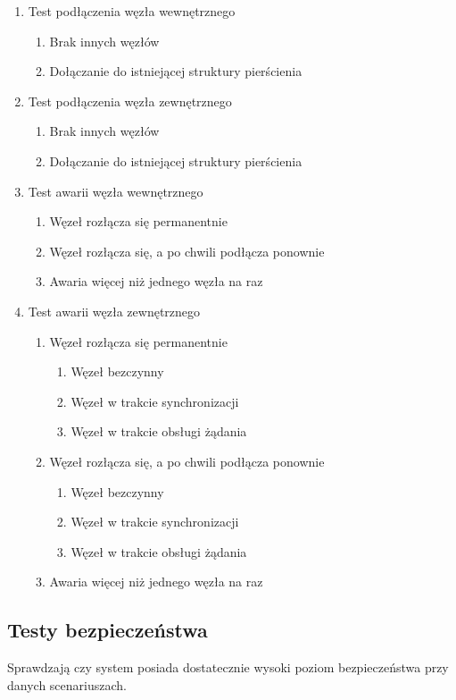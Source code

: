 \begin{enumerate}
\item Test podłączenia węzła wewnętrznego
	\begin{enumerate}
	\item Brak innych węzłów
	\item Dołączanie do istniejącej struktury pierścienia
	\end{enumerate}
\item Test podłączenia węzła zewnętrznego
	\begin{enumerate}
	\item Brak innych węzłów
	\item Dołączanie do istniejącej struktury pierścienia
	\end{enumerate}
\item Test awarii węzła wewnętrznego
	\begin{enumerate}
	\item Węzeł rozłącza się permanentnie
	\item Węzeł rozłącza się, a po chwili podłącza ponownie
	\item Awaria więcej niż jednego węzła na raz
	\end{enumerate}
\item Test awarii węzła zewnętrznego
	\begin{enumerate}
	\item Węzeł rozłącza się permanentnie
			\begin{enumerate}
			\item Węzeł bezczynny
			\item Węzeł w trakcie synchronizacji
			\item Węzeł w trakcie obsługi żądania
			\end{enumerate}
	\item Węzeł rozłącza się, a po chwili podłącza ponownie
			\begin{enumerate}
			\item Węzeł bezczynny
			\item Węzeł w trakcie synchronizacji
			\item Węzeł w trakcie obsługi żądania
			\end{enumerate}
	\item Awaria więcej niż jednego węzła na raz
	\end{enumerate}
\end{enumerate}

\subsection[Testy bezpieczeństwa]{Testy bezpieczeństwa}
Sprawdzają czy system posiada dostatecznie wysoki poziom bezpieczeństwa przy danych scenariuszach. 

